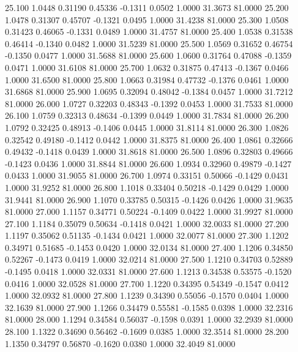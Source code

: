   25.100   1.0448   0.31190   0.45336  -0.1311   0.0502   1.0000  31.3673  81.0000
  25.200   1.0478   0.31307   0.45707  -0.1321   0.0495   1.0000  31.4238  81.0000
  25.300   1.0508   0.31423   0.46065  -0.1331   0.0489   1.0000  31.4757  81.0000
  25.400   1.0538   0.31538   0.46414  -0.1340   0.0482   1.0000  31.5239  81.0000
  25.500   1.0569   0.31652   0.46754  -0.1350   0.0477   1.0000  31.5688  81.0000
  25.600   1.0600   0.31764   0.47088  -0.1359   0.0471   1.0000  31.6108  81.0000
  25.700   1.0632   0.31875   0.47413  -0.1367   0.0466   1.0000  31.6500  81.0000
  25.800   1.0663   0.31984   0.47732  -0.1376   0.0461   1.0000  31.6868  81.0000
  25.900   1.0695   0.32094   0.48042  -0.1384   0.0457   1.0000  31.7212  81.0000
  26.000   1.0727   0.32203   0.48343  -0.1392   0.0453   1.0000  31.7533  81.0000
  26.100   1.0759   0.32313   0.48634  -0.1399   0.0449   1.0000  31.7834  81.0000
  26.200   1.0792   0.32425   0.48913  -0.1406   0.0445   1.0000  31.8114  81.0000
  26.300   1.0826   0.32542   0.49180  -0.1412   0.0442   1.0000  31.8375  81.0000
  26.400   1.0861   0.32666   0.49432  -0.1418   0.0439   1.0000  31.8618  81.0000
  26.500   1.0896   0.32803   0.49666  -0.1423   0.0436   1.0000  31.8844  81.0000
  26.600   1.0934   0.32960   0.49879  -0.1427   0.0433   1.0000  31.9055  81.0000
  26.700   1.0974   0.33151   0.50066  -0.1429   0.0431   1.0000  31.9252  81.0000
  26.800   1.1018   0.33404   0.50218  -0.1429   0.0429   1.0000  31.9441  81.0000
  26.900   1.1070   0.33785   0.50315  -0.1426   0.0426   1.0000  31.9635  81.0000
  27.000   1.1157   0.34771   0.50224  -0.1409   0.0422   1.0000  31.9927  81.0000
  27.100   1.1184   0.35079   0.50634  -0.1418   0.0421   1.0000  32.0033  81.0000
  27.200   1.1197   0.35062   0.51135  -0.1434   0.0421   1.0000  32.0077  81.0000
  27.300   1.1202   0.34971   0.51685  -0.1453   0.0420   1.0000  32.0134  81.0000
  27.400   1.1206   0.34850   0.52267  -0.1473   0.0419   1.0000  32.0214  81.0000
  27.500   1.1210   0.34703   0.52889  -0.1495   0.0418   1.0000  32.0331  81.0000
  27.600   1.1213   0.34538   0.53575  -0.1520   0.0416   1.0000  32.0528  81.0000
  27.700   1.1220   0.34395   0.54349  -0.1547   0.0412   1.0000  32.0932  81.0000
  27.800   1.1239   0.34390   0.55056  -0.1570   0.0404   1.0000  32.1639  81.0000
  27.900   1.1266   0.34479   0.55581  -0.1585   0.0398   1.0000  32.2316  81.0000
  28.000   1.1294   0.34584   0.56037  -0.1598   0.0391   1.0000  32.2939  81.0000
  28.100   1.1322   0.34690   0.56462  -0.1609   0.0385   1.0000  32.3514  81.0000
  28.200   1.1350   0.34797   0.56870  -0.1620   0.0380   1.0000  32.4049  81.0000
